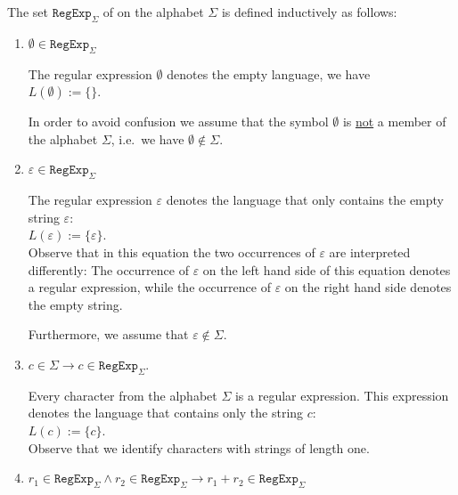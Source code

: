 \begin{Definition}
  The set \( \texttt{RegExp}_\Sigma \) of  on the alphabet \( \Sigma \) is defined inductively as follows:
  \begin{enumerate}
  \item $\emptyset \in \texttt{RegExp}_\Sigma$ \index{$\emptyset$}

        The regular expression $\emptyset$ denotes the empty language, we have
        \\[0.2cm]
        \hspace*{1.3cm}
        $L(\emptyset) := \{\}$.

        In order to avoid confusion we assume that the symbol $\emptyset$ is \underline{not} a member of the
        alphabet $\Sigma$, i.e.~we have $\emptyset \not\in \Sigma$.
  \item $\varepsilon \in \texttt{RegExp}_\Sigma$ \index{$\varepsilon$}

        The regular expression $\varepsilon$ denotes the language that only contains the empty
        string $\varepsilon$: 
        \\[0.2cm]
        \hspace*{1.3cm}
        $L(\varepsilon) := \{ \varepsilon \}$.
        \\[0.2cm]
        Observe that in this equation the two occurrences of $\varepsilon$ are interpreted differently:
        The occurrence of $\varepsilon$ on the left hand side of this equation denotes a regular
        expression, while the occurrence of $\varepsilon$ on the right hand side denotes the empty
        string.

        Furthermore, we assume that $\varepsilon \not\in \Sigma$.
  \item $c \in \Sigma \rightarrow c \in \texttt{RegExp}_\Sigma$.

        Every character from the alphabet $\Sigma$ is a regular expression.  This expression denotes
        the language that contains only the string $c$:
        \\[0.2cm]
        \hspace*{1.3cm}
        $L(c) := \{ c \}$.
        \\[0.2cm]
        Observe that we identify characters with strings of length one.
  \item $r_1 \in \texttt{RegExp}_\Sigma \wedge r_2 \in \texttt{RegExp}_\Sigma
         \rightarrow r_1 + r_2 \in \texttt{RegExp}_\Sigma$


\end{enumerate}
\end{Definition}
